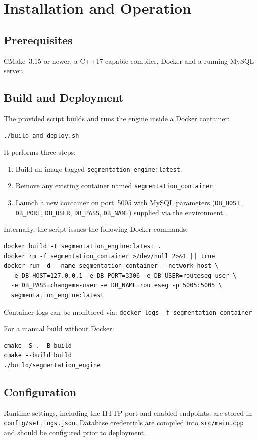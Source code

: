 \documentclass{article}
\begin{document}
\section{Installation and Operation}
\subsection{Prerequisites}
CMake~3.15 or newer, a C++17 capable compiler, Docker and a running MySQL server.

\subsection{Build and Deployment}
The provided script builds and runs the engine inside a Docker container:
\begin{verbatim}
./build_and_deploy.sh
\end{verbatim}
It performs three steps:
\begin{enumerate}
  \item Build an image tagged \texttt{segmentation\_engine:latest}.
  \item Remove any existing container named \texttt{segmentation\_container}.
  \item Launch a new container on port~5005 with MySQL parameters (\texttt{DB\_HOST}, \texttt{DB\_PORT}, \texttt{DB\_USER}, \texttt{DB\_PASS}, \texttt{DB\_NAME}) supplied via the environment.
\end{enumerate}

Internally, the script issues the following Docker commands:
\begin{verbatim}
docker build -t segmentation_engine:latest .
docker rm -f segmentation_container >/dev/null 2>&1 || true
docker run -d --name segmentation_container --network host \
  -e DB_HOST=127.0.0.1 -e DB_PORT=3306 -e DB_USER=routeseg_user \
  -e DB_PASS=changeme-user -e DB_NAME=routeseg -p 5005:5005 \
  segmentation_engine:latest
\end{verbatim}
Container logs can be monitored via:\newline
\texttt{docker logs -f segmentation\_container}

For a manual build without Docker:
\begin{verbatim}
cmake -S . -B build
cmake --build build
./build/segmentation_engine
\end{verbatim}

\subsection{Configuration}
Runtime settings, including the HTTP port and enabled endpoints, are stored in \texttt{config/settings.json}. Database credentials are compiled into \texttt{src/main.cpp} and should be configured prior to deployment.
\end{document}
